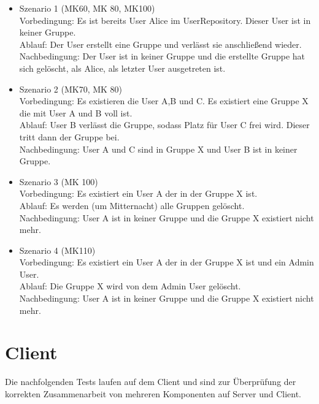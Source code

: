 \documentclass[a4paper]{scrreprt}
\begin{document}
\begin{itemize}

\item Szenario 1 (MK60, MK 80, MK100)\\
Vorbedingung: Es ist bereits User Alice im UserRepository. Dieser User ist in keiner Gruppe.\\
Ablauf: Der User erstellt eine Gruppe und verlässt sie anschließend wieder.\\
Nachbedingung: Der User ist in keiner Gruppe und die erstellte Gruppe hat sich gelöscht, als Alice, als letzter User ausgetreten ist.\\


\item Szenario 2 (MK70, MK 80)\\
Vorbedingung: Es existieren die User A,B und C. Es existiert eine Gruppe X die mit User A und B voll ist. \\
Ablauf: User B verlässt die Gruppe, sodass Platz für User C frei wird. Dieser tritt dann der Gruppe bei.\\
Nachbedingung: User A und C sind in Gruppe X und User B ist in keiner Gruppe.\\


\item Szenario 3 (MK 100)\\
Vorbedingung: Es existiert ein User A der in der Gruppe X ist.\\
Ablauf: Es werden (um Mitternacht) alle Gruppen gelöscht.\\
Nachbedingung: User A  ist in keiner Gruppe und die Gruppe X existiert nicht mehr.\\

\item Szenario 4 (MK110)\\
Vorbedingung: Es existiert ein User A der in der Gruppe X ist und ein Admin User.\\
Ablauf: Die Gruppe X wird von dem Admin User gelöscht.\\
Nachbedingung: User A  ist in keiner Gruppe und die Gruppe X existiert nicht mehr.\\


\end{itemize}



\section{Client}

Die nachfolgenden Tests laufen auf dem Client und sind zur Überprüfung der korrekten Zusammenarbeit von mehreren Komponenten auf Server und Client.
\end{document}
